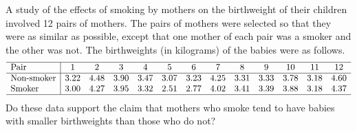 \begin{example}
A study of the effects of smoking by mothers on the birthweight of their children involved 12 pairs of mothers. The pairs of mothers were selected so that they were as similar as possible, except that one mother of each pair was a smoker and the other was not. The birthweights (in kilograms) of the babies were as follows.
\small
\[\begin{array}{l|cccccccccccc} \hline
\text{Pair}			& 1      &  2     & 3      & 4      & 5      & 6      & 7      & 8      & 9      & 10     & 11     & 12 		\\ \hline
\text{Non-smoker}	& 3.22   & 4.48   & 3.90   & 3.47   & 3.07   & 3.23   & 4.25   & 3.31   & 3.33   & 3.78   & 3.18   & 4.60  	\\ 
\text{Smoker}		& 3.00   & 4.27   & 3.95   & 3.32   & 2.51   & 2.77   & 4.02   & 3.41   & 3.39   & 3.88   & 3.18   & 4.37 	\\ \hline
\end{array}\]
\normalsize
Do these data support the claim that mothers who smoke tend to have babies with smaller birthweights than those who do not? 
\end{example}

